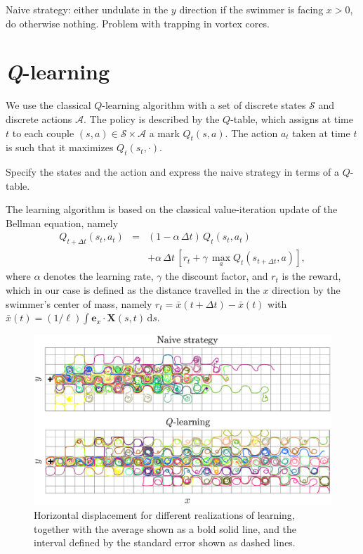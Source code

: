 \documentclass[prl,aps,superscriptaddress,twocolumn]{revtex4-1}
\begin{document}
Naive strategy: either undulate in the $y$ direction if the swimmer is facing $x>0$, do otherwise nothing. Problem with trapping in vortex cores.

\section{\textit{Q}-learning}

We use the classical $Q$-learning algorithm with a set of discrete states $\mathcal{S}$ and discrete actions $\mathcal{A}$. The policy is described by the $Q$-table, which assigns at time $t$ to each couple $(s,a)\in \mathcal{S}\times \mathcal{A}$ a mark $Q_t(s,a)$. The action $a_t$ taken at time $t$ is such that it maximizes $Q_t(s_t,\cdot)$.

Specify the states and the action and express the naive strategy in terms of a $Q$-table.

The learning algorithm is based on the classical value-iteration update of the Bellman equation, namely
\begin{eqnarray}
    Q_{t+\Delta t}(s_t,a_t) &=& (1-\alpha\,\Delta t)\,Q_{t}(s_t,a_t) \nonumber\\
    &&+ \alpha\,\Delta t\,\left[r_t + \gamma\,\max_a Q_{t}(s_{t+\Delta t},a) \right],
    \label{eq:Qlearning}
\end{eqnarray}
where $\alpha$ denotes the learning rate, $\gamma$ the discount factor, and $r_t$ is the reward, which in our case is defined as the distance travelled in the $x$ direction by the swimmer's center of mass, namely $r_t = \bar{x}(t+\Delta t)-\bar{x}(t)$ with $\bar{x}(t) = (1/\ell) \int \bm e_x\cdot\bm X(s,t)\,\mathrm{d}s$.
\begin{figure}[ht]
  \centerline{\includegraphics[width=\columnwidth]{compare_traj}}
  \caption{\label{fig:compare_traj} Horizontal displacement for different realizations of  learning, together with the average shown as a bold solid line, and the interval defined by the standard error shown as dashed lines.}
\end{figure}
\end{document}
